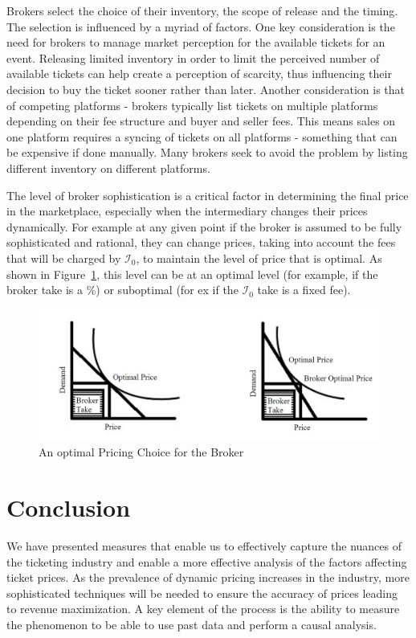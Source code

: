 \documentclass[letterpaper, 12pt]{article}
\begin{document}
 Brokers select the choice of their inventory, the scope of release and the timing. The selection is influenced by a myriad of factors. One key consideration is the need for brokers to manage market perception for the available tickets for an event. Releasing limited inventory in order to limit the perceived number of available tickets can help create a perception of scarcity, thus influencing their decision to buy the ticket sooner rather than later. Another consideration is that of competing platforms - brokers typically list tickets on multiple platforms depending on their fee structure and buyer and seller fees. This means sales on one platform requires a syncing of tickets on all platforms - something that can be expensive if done manually. Many brokers seek to avoid the problem by listing different inventory on different platforms.

 The level of broker sophistication is a critical factor in determining the final price in the marketplace, especially when the intermediary changes their prices dynamically. For example at any given point if the broker is assumed to be fully sophisticated and rational, they can change prices, taking into account the fees that will be charged by $\mathcal{I}_0$, to maintain the level of price that is optimal. As shown in Figure~\ref{fig:demc}, this level can be at an optimal level (for example, if the broker take is a \%) or suboptimal (for ex if the $\mathcal{I}_0$ take is a fixed fee). 
\begin{figure}[h]
	\centering
	\includegraphics[scale=.3]{IMG_20151201_112640407.jpg}
	\caption{An optimal Pricing Choice for the Broker}
	\label{fig:demc}
\end{figure}

\section{Conclusion}
We have presented measures that enable us to effectively capture the nuances of the ticketing industry and enable a more effective analysis of the factors affecting ticket prices. As the prevalence of dynamic pricing increases in the industry, more sophisticated techniques will be needed to ensure the accuracy of prices leading to revenue maximization. A key element of the process is the ability to measure the phenomenon to be able to use past data and perform a causal analysis. 
\end{document}
